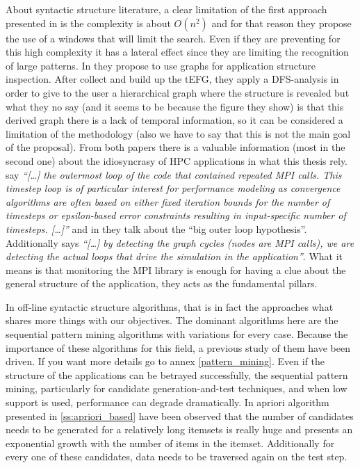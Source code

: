 About syntactic structure literature, a clear limitation of the first approach
presented in \cite{noeth2009scalatrace} is the complexity is about $O(n^2)$ and
for that reason they propose the use of a windows that will limit the search.
Even if they are preventing for this high complexity it has a lateral effect
since they are limiting the recognition of large patterns. In \cite{aguilar2016event}
they propose to use graphs for application structure inspection. After collect
and build up the tEFG, they apply a DFS-analysis in order to give to the user
a hierarchical graph where the structure is revealed but what they no say (and
it seems to be because the figure they show) is that this derived graph there is
a lack of temporal information, so it can be considered a limitation 
of the methodology
(also we have to say that this is not the main goal of the proposal). From both
papers there is a valuable information (most in the second one) about the
idiosyncrasy of HPC applications in what this thesis rely.
\cite{noeth2009scalatrace} say \textit{``[\ldots] the outermost loop of the code
that contained repeated MPI calls. This timestep loop is of particular interest
for performance modeling as convergence algorithms are often based on either
fixed iteration bounds for the number of timesteps or epsilon-based error 
constraints resulting in input-specific number of timesteps. [\ldots]''} and in \cite{aguilar2016event} they talk
about the ``big outer loop hypothesis''. Additionally says \textit{``[\ldots] by
detecting the graph cycles (nodes are MPI calls), we are detecting the actual
loops that drive the simulation in the application''}. What it means is that
monitoring the MPI library is enough for having a clue about the general 
structure of the application, they acts as the fundamental pillars.

In off-line syntactic structure algorithms, that
is in fact the approaches what shares more things with our objectives. The
dominant algorithms here are the sequential pattern mining algorithms with
variations for every case. Because the importance of these algorithms for this
field, a previous study of them have been driven. If you want more details go to
annex \ref{pattern_mining}. Even if the structure of the applications can be
betrayed successfully, the sequential pattern mining, particularly for candidate 
generation-and-test techniques, and when low support is used, performance can 
degrade dramatically. In apriori algorithm presented in \ref{ss:apriori_based} 
have been observed that
the number of candidates needs to be generated for a relatively long itemsets is
really huge and presents an exponential growth with the number of items in the
itemset. Additionally for every one of these candidates, data needs to be
traversed again on the test step.

